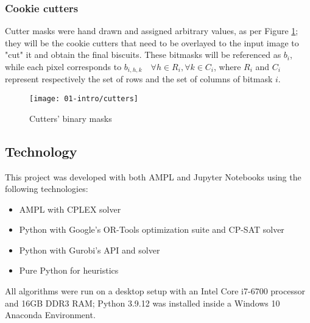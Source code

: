 \subsubsection{Cookie cutters}
Cutter masks were hand drawn and assigned arbitrary values, as per Figure \ref{fig:cutters}; they will be the cookie cutters that need to be overlayed to the input image to "cut" it and obtain the final biscuits. These bitmasks will be referenced as $b_i$, while each pixel corresponds to $b_{i, h, k} \quad \forall h \in R_i, \forall k \in C_i$, where $R_i$ and $C_i$ represent respectively the set of rows and the set of columns of bitmask $i$.

\begin{figure}[H]
	\centering	
	\texttt{[image: 01-intro/cutters]}
	\caption{Cutters' binary masks}
	\label{fig:cutters}
\end{figure}

\subsection{Technology}
This project was developed with both AMPL and Jupyter Notebooks using the following technologies:
\begin{itemize}[itemsep=-1mm, topsep=-1mm]
	\item AMPL with CPLEX solver
	\item Python with Google's OR-Tools optimization suite and CP-SAT solver
	\item Python with Gurobi's API and solver
	\item Pure Python for heuristics
\end{itemize}

All algorithms were run on a desktop setup with an Intel Core i7-6700 processor and 16GB DDR3 RAM; Python 3.9.12 was installed inside a Windows 10 Anaconda Environment.
